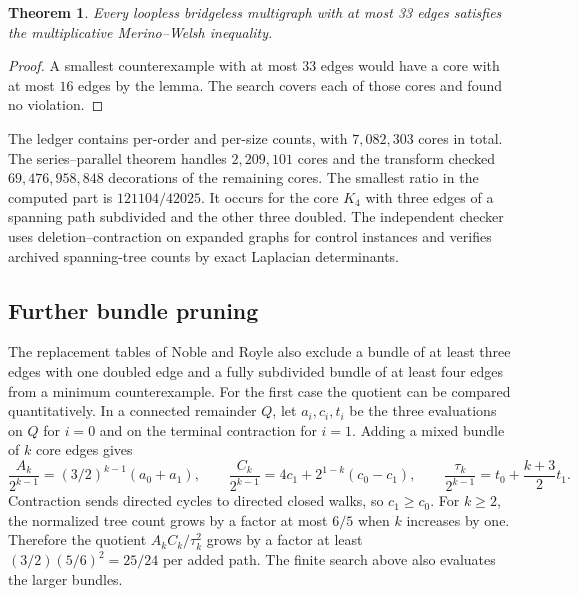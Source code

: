 \documentclass[11pt]{article}
\newtheorem{theorem}{Theorem}
\newcommand{\scope}{33}
\begin{document}
\begin{theorem}
Every loopless bridgeless multigraph with at most \scope{} edges
satisfies the multiplicative Merino--Welsh inequality.
\end{theorem}
\begin{proof}
A smallest counterexample with at most \scope{} edges would have
a core with at most \(16\) edges by the lemma.
The search covers each of those cores and found no violation.
\end{proof}

The ledger contains per-order and per-size counts, with
\(7{,}082{,}303\) cores in total. The series--parallel theorem
handles \(2{,}209{,}101\) cores and the transform checked
\(69{,}476{,}958{,}848\) decorations of the remaining cores.
The smallest ratio in the computed part is \(121104/42025\).
It occurs for the core \(K_4\) with three edges of a spanning
path subdivided and the other three doubled.
The independent checker uses deletion--contraction on expanded
graphs for control instances and verifies archived spanning-tree
counts by exact Laplacian determinants.

\subsection*{Further bundle pruning}
The replacement tables of Noble and Royle \cite{noble} also
exclude a bundle of at least three edges with one doubled edge
and a fully subdivided bundle of at least four edges from a
minimum counterexample. For the first case the quotient can be
compared quantitatively. In a connected remainder \(Q\), let
\(a_i,c_i,t_i\) be the three evaluations on \(Q\) for \(i=0\)
and on the terminal contraction for \(i=1\). Adding a mixed bundle
of \(k\) core edges gives
\[
\frac{A_k}{2^{k-1}}=(3/2)^{k-1}(a_0+a_1),\qquad
\frac{C_k}{2^{k-1}}=4c_1+2^{1-k}(c_0-c_1),\qquad
\frac{\tau_k}{2^{k-1}}=t_0+\frac{k+3}{2}t_1.
\]
Contraction sends directed cycles to directed closed walks, so
\(c_1\geq c_0\). For \(k\geq2\), the normalized tree count grows
by a factor at most \(6/5\) when \(k\) increases by one. Therefore
the quotient \(A_kC_k/\tau_k^2\) grows by a factor at least
\((3/2)(5/6)^2=25/24\) per added path. The finite search above
also evaluates the larger bundles.
\end{document}

